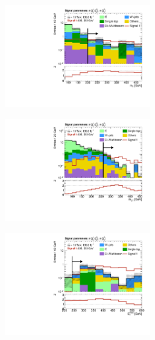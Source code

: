 \begin{figure}
	\centering
	\begin{subfigure}[b]{0.5\linewidth}
		\centering\includegraphics[width=0.7\textwidth]{N-1_cut_scan/n1_800_250/mt}
		\caption{}
	\end{subfigure}\hfill
	\begin{subfigure}[b]{0.5\linewidth}
		\centering\includegraphics[width=0.7\textwidth]{N-1_cut_scan/n1_800_250/mct}
		\caption{}
	\end{subfigure}\hfill
	\begin{subfigure}[b]{0.5\linewidth}
		\centering\includegraphics[width=0.7\textwidth]{N-1_cut_scan/n1_800_250/met}

\end{subfigure}
\end{figure}
